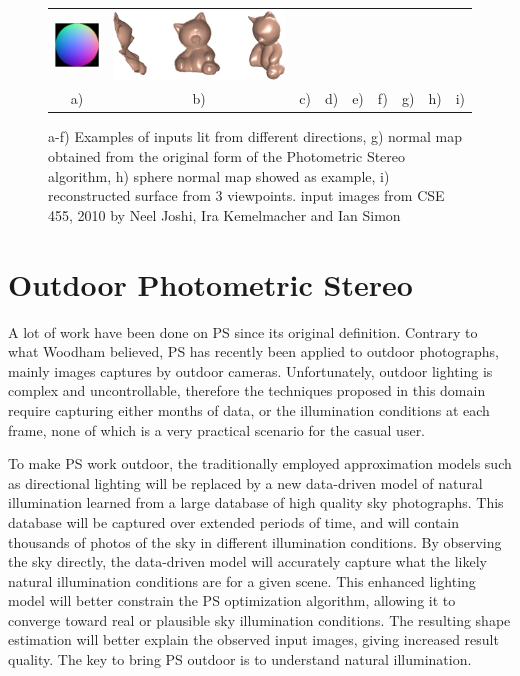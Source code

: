 \documentclass{report}
\begin{document}
\begin{figure}
\begin{tabular}{cccccc|ccc}
\includegraphics[width=.04\linewidth]{PS/sphere_nm.png} &
\includegraphics[width=.18\linewidth]{PS/3d.png} \\
a) & b) & c) & d) & e) & f) & g) & h) & i)
\end{tabular}
\caption{a-f) Examples of inputs lit from different directions, g) normal map obtained from the original form of the Photometric Stereo algorithm, h) sphere normal map showed as example, i) reconstructed surface from 3 viewpoints.\newline
{\small input images from CSE 455, 2010 by Neel Joshi, Ira Kemelmacher and Ian Simon}
}
\label{fig:PS_example}
\end{figure}

\section{Outdoor Photometric Stereo}

A lot of work have been done on PS since its original definition. Contrary to what Woodham believed, PS has recently been applied to outdoor photographs, mainly images captures by outdoor cameras. Unfortunately, outdoor lighting is complex and uncontrollable, therefore the techniques proposed in this domain require capturing either months of data, or the illumination conditions at each frame, none of which is a very practical scenario for the casual user.

To make PS work outdoor, the traditionally employed approximation models such as directional lighting will be replaced by a new data-driven model of natural illumination learned from a large database of high quality sky photographs. This database will be captured over extended periods of time, and will contain thousands of photos of the sky in different illumination conditions. By observing the sky directly, the data-driven model will accurately capture what the likely natural illumination conditions are for a given scene. This enhanced lighting model will better constrain the PS optimization algorithm, allowing it to converge toward real or plausible sky illumination conditions. The resulting shape estimation will better explain the observed input images, giving increased result quality. The key to bring PS outdoor is to understand natural illumination.
\end{document}

